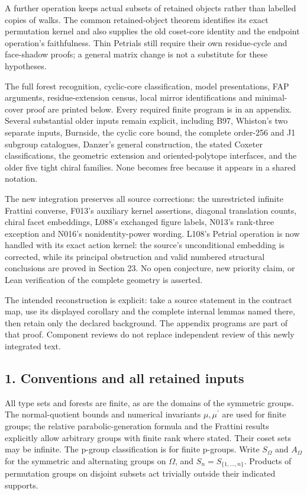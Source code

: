 \documentclass[
  10pt,
  letterpaper,
]{article}
\begin{document}
A further operation keeps actual subsets of retained objects rather than
labelled copies of walks. The common retained-object theorem identifies
its exact permutation kernel and also supplies the old coset-core
identity and the endpoint operation's faithfulness. Thin Petrials still
require their own residue-cycle and face-shadow proofs; a general matrix
change is not a substitute for these hypotheses.

The full forest recognition, cyclic-core classification, model
presentations, FAP arguments, residue-extension census, local mirror
identifications and minimal-cover proof are printed below. Every
required finite program is in an appendix. Several substantial older
inputs remain explicit, including B97, Whiston's two separate inputs,
Burnside, the cyclic core bound, the complete order-256 and J1 subgroup
catalogues, Danzer's general construction, the stated Coxeter
classifications, the geometric extension and oriented-polytope
interfaces, and the older five tight chiral families. None becomes free
because it appears in a shared notation.

The new integration preserves all source corrections: the unrestricted
infinite Frattini converse, F013's auxiliary kernel assertions, diagonal
translation counts, chiral facet embeddings, L088's exchanged figure
labels, N013's rank-three exception and N016's nonidentity-power
wording. L108's Petrial operation is now handled with its exact action
kernel: the source's unconditional embedding is corrected, while its
principal obstruction and valid numbered structural conclusions are
proved in Section 23. No open conjecture, new priority claim, or Lean
verification of the complete geometry is asserted.

The intended reconstruction is explicit: take a source statement in the
contract map, use its displayed corollary and the complete internal
lemmas named there, then retain only the declared background. The
appendix programs are part of that proof. Component reviews do not
replace independent review of this newly integrated text.

\subsection{1. Conventions and all retained
inputs}\label{conventions-and-all-retained-inputs}

All type sets and forests are finite, as are the domains of the
symmetric groups. The normal-quotient bounds and numerical invariants
\(\mu,\mu^{\prime}\) are used for finite groups; the relative
parabolic-generation formula and the Frattini results explicitly allow
arbitrary groups with finite rank where stated. Their coset sets may be
infinite. The p-group classification is for finite p-groups. Write
\(S_\Omega\) and \(A_\Omega\) for the symmetric and alternating groups
on \(\Omega\), and \(S_n=S_{\{1,\ldots,n\}}\). Products of permutation
groups on disjoint subsets act trivially outside their indicated
supports.
\end{document}
